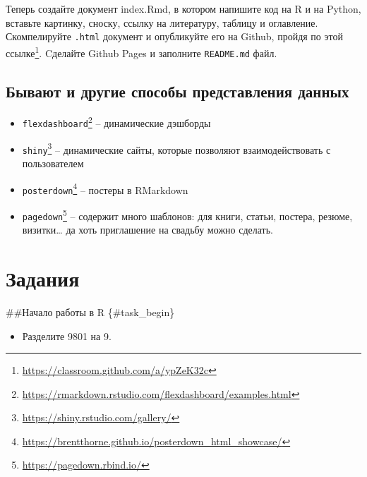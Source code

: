 \documentclass[
]{book}
\makeatletter
\providecommand{\tightlist}{%
  \setlength{\itemsep}{0pt}\setlength{\parskip}{0pt}}
\renewcommand{\href}[2]{#2\footnote{\url{#1}}}
\newenvironment{kframe}{%
    \medskip{}
    \setlength{\fboxsep}{.8em}
    \def\at@end@of@kframe{}%
    \ifinner\ifhmode%
    \def\at@end@of@kframe{\end{minipage}}%
    \begin{minipage}{\columnwidth}%
    \fi\fi%
    \def\FrameCommand##1{\hskip\@totalleftmargin \hskip-\fboxsep
    \colorbox{shadecolor}{##1}\hskip-\fboxsep
        \hskip-\linewidth \hskip-\@totalleftmargin \hskip\columnwidth}%
    \MakeFramed {\advance\hsize-\width
      \@totalleftmargin\z@ \linewidth\hsize
      \@setminipage}}%
  {\par\unskip\endMakeFramed%
    \at@end@of@kframe}
\newenvironment{rmdblock}[1]
  {
    \begin{itemize}
    \renewcommand{\labelitemi}{
      \raisebox{-.7\height}[0pt][0pt]{
        {\setkeys{Gin}{width=3em,keepaspectratio}\texttt{[image: images/\#1]}}
        }
        }
        \setlength{\fboxsep}{1em}
        \begin{kframe}
        \item
      }
      {
        \end{kframe}
        \end{itemize}
      }
\newenvironment{rmdtask}
      {\begin{rmdblock}{task}}
      {\end{rmdblock}}
\makeatother
\begin{document}
\begin{rmdtask}
Теперь создайте документ index.Rmd, в котором напишите код на R и на
Python, вставьте картинку, сноску, ссылку на литературу, таблицу и
оглавление. Скомпелируйте \texttt{.html} документ и опубликуйте его на
Github, пройдя \href{https://classroom.github.com/a/ypZeK32c}{по этой
ссылке}. Cделайте Github Pages и заполните \texttt{README.md} файл.
\end{rmdtask}

\hypertarget{ux431ux44bux432ux430ux44eux442-ux438-ux434ux440ux443ux433ux438ux435-ux441ux43fux43eux441ux43eux431ux44b-ux43fux440ux435ux434ux441ux442ux430ux432ux43bux435ux43dux438ux44f-ux434ux430ux43dux43dux44bux445}{%
\section{Бывают и другие способы представления данных}\label{ux431ux44bux432ux430ux44eux442-ux438-ux434ux440ux443ux433ux438ux435-ux441ux43fux43eux441ux43eux431ux44b-ux43fux440ux435ux434ux441ux442ux430ux432ux43bux435ux43dux438ux44f-ux434ux430ux43dux43dux44bux445}}

\begin{itemize}
\tightlist
\item
  \href{https://rmarkdown.rstudio.com/flexdashboard/examples.html}{\texttt{flexdashboard}} -- динамические дэшборды
\item
  \href{https://shiny.rstudio.com/gallery/}{\texttt{shiny}} -- динамические сайты, которые позволяют взаимодействовать с пользователем
\item
  \href{https://brentthorne.github.io/posterdown_html_showcase/}{\texttt{posterdown}} -- постеры в RMarkdown
\item
  \href{https://pagedown.rbind.io/}{\texttt{pagedown}} -- содержит много шаблонов: для книги, статьи, постера, резюме, визитки\ldots{} да хоть приглашение на свадьбу можно сделать.
\end{itemize}

\hypertarget{tasks}{%
\chapter{Задания}\label{tasks}}

\#\#Начало работы в R \{\#task\_begin\}

\begin{itemize}
\tightlist
\item
  Разделите 9801 на 9.
\end{itemize}
\end{document}

